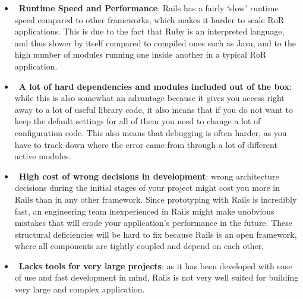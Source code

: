 \begin{itemize}
\item~\textbf{Runtime Speed and Performance}: Rails has a fairly ‘slow’ runtime speed compared to other frameworks, which makes it harder to scale RoR applications. This is due to the fact that Ruby is an interpreted language, and thus slower by itself compared to compiled ones such as Java, and to the high number of modules running one inside another in a typical RoR application.

\item~\textbf{A lot of hard dependencies and modules included out of the box}: while this is also somewhat an advantage because it gives you access right away to a lot of useful library code, it also means that if you do not want to keep the default settings for all of them you need to change a lot of configuration code. This also means that debugging is often harder, as you have to track down where the error came from through a lot of different active modules.

\item~\textbf{High cost of wrong decisions in development}: wrong architecture decisions during the initial stages of your project might cost you more in Rails than in any other framework. Since prototyping with Rails is incredibly fast, an engineering team inexperienced in Rails might make unobvious mistakes that will erode your application’s performance in the future. These structural deficiencies will be hard to fix because Rails is an open framework, where all components are tightly coupled and depend on each other.

\item~\textbf{Lacks tools for very large projects}: as it has been developed with ease of use and fast development in mind, Rails is not very well suited for building very large and complex application.
\end{itemize}